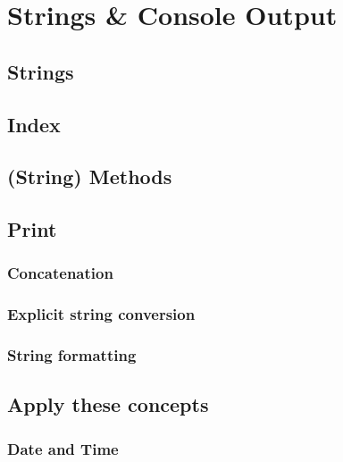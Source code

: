  

\chapter{Strings \& Console Output}

	\section{Strings}
	
	\section{Index}
	
	
	\section{(String) Methods}
	
	
	\section{Print}
	
		\subsection{Concatenation}
		
		\subsection{Explicit string conversion}
		
		\subsection{String formatting}
		
	\section{Apply these concepts}
	
		\subsection{Date and Time}
		
